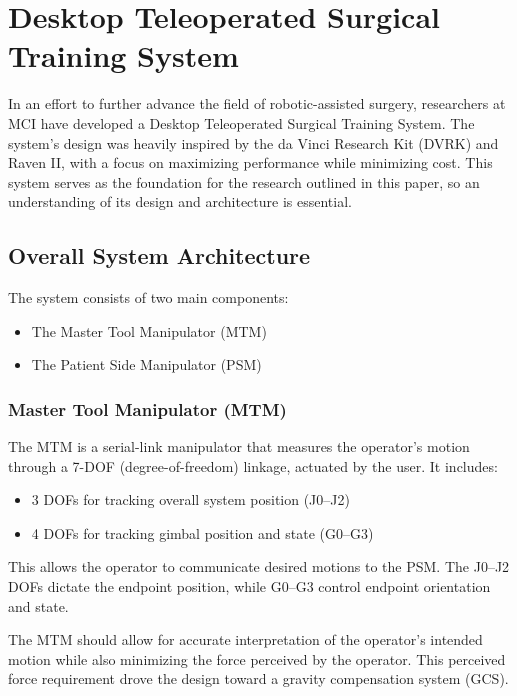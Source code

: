 \chapter{Desktop Teleoperated Surgical Training System}

In an effort to further advance the field of robotic-assisted surgery, researchers at MCI have developed a Desktop Teleoperated Surgical Training System. The system's design was heavily inspired by the da Vinci Research Kit (DVRK) and Raven II, with a focus on maximizing performance while minimizing cost. This system serves as the foundation for the research outlined in this paper, so an understanding of its design and architecture is essential.

\section{Overall System Architecture}

The system consists of two main components:

\begin{itemize}
    \item The Master Tool Manipulator (MTM)
    \item The Patient Side Manipulator (PSM)
\end{itemize}

\subsection{Master Tool Manipulator (MTM)}
The MTM is a serial-link manipulator that measures the operator's motion through a 7-DOF (degree-of-freedom) linkage, actuated by the user. It includes:

\begin{itemize}
    \item 3 DOFs for tracking overall system position (J0--J2)
    \item 4 DOFs for tracking gimbal position and state (G0--G3)
\end{itemize}

This allows the operator to communicate desired motions to the PSM. The J0--J2 DOFs dictate the endpoint position, while G0--G3 control endpoint orientation and state.

The MTM should allow for accurate interpretation of the operator's intended motion while also minimizing the force perceived by the operator. This perceived force requirement drove the design toward a gravity compensation system (GCS).

